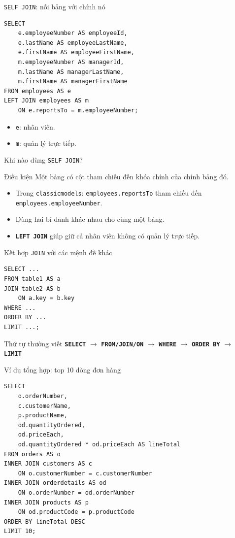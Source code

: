 \documentclass[aspectratio=169,11pt]{beamer}
\newcommand{\col}[1]{\texttt{#1}}
\newcommand{\kw}[1]{\textbf{\texttt{#1}}}
\begin{document}
\begin{frame}[fragile]{\texttt{SELF JOIN}: nối bảng với chính nó}
\begin{lstlisting}
SELECT
    e.employeeNumber AS employeeId,
    e.lastName AS employeeLastName,
    e.firstName AS employeeFirstName,
    m.employeeNumber AS managerId,
    m.lastName AS managerLastName,
    m.firstName AS managerFirstName
FROM employees AS e
LEFT JOIN employees AS m
    ON e.reportsTo = m.employeeNumber;
\end{lstlisting}
\begin{itemize}
  \item \texttt{e}: nhân viên.
  \item \texttt{m}: quản lý trực tiếp.
\end{itemize}
\end{frame}

\begin{frame}{Khi nào dùng \texttt{SELF JOIN}?}
\begin{block}{Điều kiện}
Một bảng có cột tham chiếu đến khóa chính của chính bảng đó.
\end{block}
\begin{itemize}
  \item Trong \texttt{classicmodels}: \col{employees.reportsTo} tham chiếu đến \col{employees.employeeNumber}.
  \item Dùng hai bí danh khác nhau cho cùng một bảng.
  \item \kw{LEFT JOIN} giúp giữ cả nhân viên không có quản lý trực tiếp.
\end{itemize}
\end{frame}

\begin{frame}[fragile]{Kết hợp \texttt{JOIN} với các mệnh đề khác}
\begin{lstlisting}
SELECT ...
FROM table1 AS a
JOIN table2 AS b
    ON a.key = b.key
WHERE ...
ORDER BY ...
LIMIT ...;
\end{lstlisting}
\begin{block}{Thứ tự thường viết}
\centering
\kw{SELECT} $\rightarrow$ \kw{FROM/JOIN/ON} $\rightarrow$ \kw{WHERE} $\rightarrow$ \kw{ORDER BY} $\rightarrow$ \kw{LIMIT}
\end{block}
\end{frame}

\begin{frame}[fragile]{Ví dụ tổng hợp: top 10 dòng đơn hàng}
\begin{lstlisting}
SELECT
    o.orderNumber,
    c.customerName,
    p.productName,
    od.quantityOrdered,
    od.priceEach,
    od.quantityOrdered * od.priceEach AS lineTotal
FROM orders AS o
INNER JOIN customers AS c
    ON o.customerNumber = c.customerNumber
INNER JOIN orderdetails AS od
    ON o.orderNumber = od.orderNumber
INNER JOIN products AS p
    ON od.productCode = p.productCode
ORDER BY lineTotal DESC
LIMIT 10;
\end{lstlisting}
\end{frame}
\end{document}
